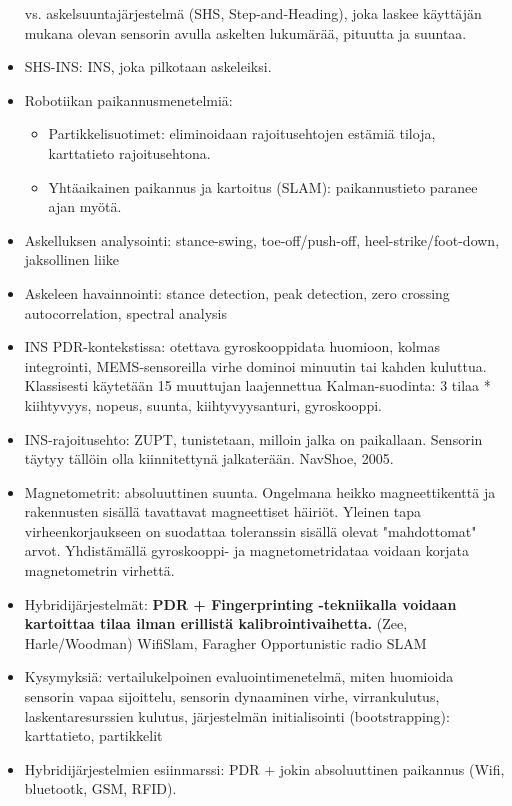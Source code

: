 \documentclass[a4paper]{scrartcl}
\begin{document}
\begin{itemize}
     vs. askelsuuntajärjestelmä (SHS, Step-and-Heading), joka laskee
     käyttäjän mukana olevan sensorin avulla askelten lukumärää, pituutta ja
     suuntaa.
   \item SHS-INS: INS, joka pilkotaan askeleiksi.
   \item Robotiikan paikannusmenetelmiä:
     \begin{itemize}
       \item Partikkelisuotimet: eliminoidaan rajoitusehtojen estämiä
         tiloja, karttatieto rajoitusehtona.
       \item Yhtäaikainen paikannus ja kartoitus (SLAM): paikannustieto paranee
         ajan myötä.
     \end{itemize}
   \item Askelluksen analysointi: stance-swing, toe-off/push-off,
     heel-strike/foot-down, jaksollinen liike
   \item Askeleen havainnointi: stance detection, peak detection, zero crossing
     autocorrelation, spectral analysis
   \item INS PDR-kontekstissa: otettava gyroskooppidata huomioon, kolmas
     integrointi, MEMS-sensoreilla virhe dominoi minuutin tai kahden
     kuluttua. Klassisesti käytetään 15 muuttujan laajennettua Kalman-suodinta:
     3 tilaa * kiihtyvyys, nopeus, suunta, kiihtyvyysanturi, gyroskooppi.
   \item INS-rajoitusehto: ZUPT, tunistetaan, milloin jalka on paikallaan.
     Sensorin täytyy tällöin olla kiinnitettynä jalkaterään. NavShoe, 2005.
   \item Magnetometrit: absoluuttinen suunta. Ongelmana heikko magneettikenttä
     ja rakennusten sisällä tavattavat magneettiset häiriöt. Yleinen tapa
     virheenkorjaukseen on suodattaa toleranssin sisällä olevat "mahdottomat"
     arvot. Yhdistämällä gyroskooppi- ja magnetometridataa voidaan korjata
     magnetometrin virhettä.
   \item Hybridijärjestelmät: \textbf{PDR + Fingerprinting -tekniikalla voidaan
     kartoittaa tilaa ilman erillistä kalibrointivaihetta.} (Zee, Harle/Woodman)
     WifiSlam, Faragher Opportunistic radio SLAM
   \item Kysymyksiä: vertailukelpoinen evaluointimenetelmä, miten huomioida
     sensorin vapaa sijoittelu, sensorin dynaaminen virhe, virrankulutus,
     laskentaresurssien kulutus, järjestelmän initialisointi (bootstrapping):
     karttatieto, partikkelit
   \item Hybridijärjestelmien esiinmarssi: PDR + jokin absoluuttinen paikannus
     (Wifi, bluetootk, GSM, RFID).
\end{itemize}
\end{document}
